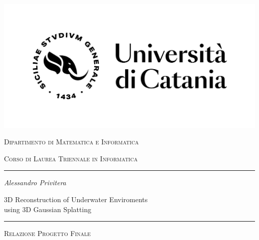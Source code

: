 \begin{titlepage}
\centering 
\includegraphics[scale=0.2]{Images/UniCT-Logo-Nero.png}

\bigskip


{\scshape
\large
Dipartimento di Matematica e Informatica
}

{\scshape
\normalsize
Corso di Laurea Triennale in Informatica
}

\bigskip


\hrule


\bigskip


\bigskip


\bigskip


\bigskip

{\itshape
\large
Alessandro Privitera
\par}


\bigskip


\bigskip


\bigskip


\bigskip

{\centering
\Large
3D Reconstruction of Underwater Enviroments\\using 3D Gaussian Splatting
\par}


\bigskip


\bigskip


\bigskip


\bigskip


\bigskip


\bigskip


\begin{minipage}[b]{8 cm}
\hrule

\bigskip

{\centering\scshape 
Relazione Progetto Finale
\par}



\end{minipage}
\end{titlepage}
